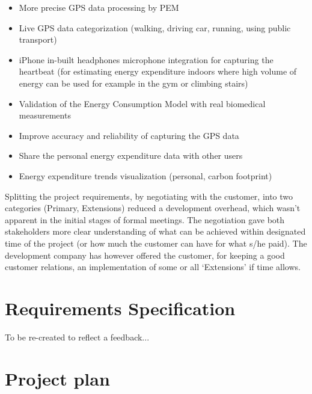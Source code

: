 \documentclass[12pt, a4paper]{report}   %
\begin{document}
	\begin{itemize}
		\begin{itemize}
			\item More precise GPS data processing by PEM
			\item Live GPS data categorization (walking, driving car, running, using public transport)
			\item iPhone in-built headphones microphone integration for capturing the heartbeat (for estimating energy expenditure indoors where high volume of energy can be used for example in the gym or climbing stairs)
			\item Validation of the Energy Consumption Model with real biomedical measurements
			\item Improve accuracy and reliability of capturing the GPS data
			\item Share the personal energy expenditure data with other users
			\item Energy expenditure trends visualization (personal, carbon footprint)
		\end{itemize}
	\end{itemize}
Splitting the project requirements, by negotiating with the customer, into two categories (Primary, Extensions) reduced a development overhead, which wasn’t apparent in the initial stages of formal meetings. The negotiation gave both stakeholders more clear understanding of what can be achieved within designated time of the project (or how much the customer can have for what s/he paid). The development company has however offered the customer, for keeping a good customer relations, an implementation of some or all ‘Extensions’ if time allows.

\section{Requirements Specification}
To be re-created to reflect a feedback...

\section{Project plan}
\end{document}
